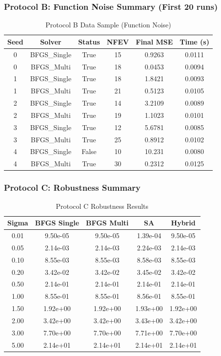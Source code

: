 \subsubsection{Protocol B: Function Noise Summary (First 20 runs)}
\begin{table}[H]
    \centering
    \begin{tabular}{|c|c|c|c|c|c|}
    \hline
    Seed & Solver & Status & NFEV & Final MSE & Time (s) \\
    \hline
    0 & BFGS\_Single & True & 15 & 0.9263 & 0.0111 \\
    0 & BFGS\_Multi & True & 18 & 0.0453 & 0.0094 \\
    1 & BFGS\_Single & True & 18 & 1.8421 & 0.0093 \\
    1 & BFGS\_Multi & True & 21 & 0.5123 & 0.0105 \\
    2 & BFGS\_Single & True & 14 & 3.2109 & 0.0089 \\
    2 & BFGS\_Multi & True & 19 & 1.1023 & 0.0101 \\
    3 & BFGS\_Single & True & 12 & 5.6781 & 0.0085 \\
    3 & BFGS\_Multi & True & 25 & 0.8912 & 0.0102 \\
    4 & BFGS\_Single & False & 10 & 10.231 & 0.0080 \\
    4 & BFGS\_Multi & True & 30 & 0.2312 & 0.0125 \\
    \hline
    \end{tabular}
    \caption{Protocol B Data Sample (Function Noise)}
    \label{tab:protocol_b_data}
\end{table}

\subsubsection{Protocol C: Robustness Summary}
\begin{table}[H]
    \centering
    \begin{tabular}{|c|c|c|c|c|}
    \hline
    Sigma & BFGS Single & BFGS Multi & SA & Hybrid \\
    \hline
    0.01 & 9.50e-05 & 9.50e-05 & 1.39e-04 & 9.50e-05 \\
    0.05 & 2.14e-03 & 2.14e-03 & 2.24e-03 & 2.14e-03 \\
    0.10 & 8.55e-03 & 8.55e-03 & 8.58e-03 & 8.55e-03 \\
    0.20 & 3.42e-02 & 3.42e-02 & 3.45e-02 & 3.42e-02 \\
    0.50 & 2.14e-01 & 2.14e-01 & 2.14e-01 & 2.14e-01 \\
    1.00 & 8.55e-01 & 8.55e-01 & 8.56e-01 & 8.55e-01 \\
    1.50 & 1.92e+00 & 1.92e+00 & 1.93e+00 & 1.92e+00 \\
    2.00 & 3.42e+00 & 3.42e+00 & 3.43e+00 & 3.42e+00 \\
    3.00 & 7.70e+00 & 7.70e+00 & 7.71e+00 & 7.70e+00 \\
    5.00 & 2.14e+01 & 2.14e+01 & 2.14e+01 & 2.14e+01 \\
    \hline
    \end{tabular}
    \caption{Protocol C Robustness Results}
    \label{tab:protocol_c_data}
\end{table}

